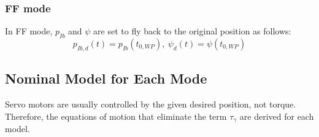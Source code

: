 \documentclass[letterpaper, 10 pt, conference]{ieeeconf}  %
\theoremstyle{definition}
\begin{document}
\subsubsection{FF mode} 
In FF mode, $p_{I b}$ and $\psi$ are set to fly back to the original position as follows:
\begin{equation} \label{eq: trajectory (FF)}
    p_{I b, d}(t) = p_{I b}(t_{0, WP}), \ \psi_d(t) = \psi(t_{0, WP})
\end{equation}
\subsection{Nominal Model for Each Mode}
Servo motors are usually controlled by the given desired position, not torque. Therefore, the equations of motion that eliminate the term $\tau_{\gamma}$ are derived for each model.
\end{document}
